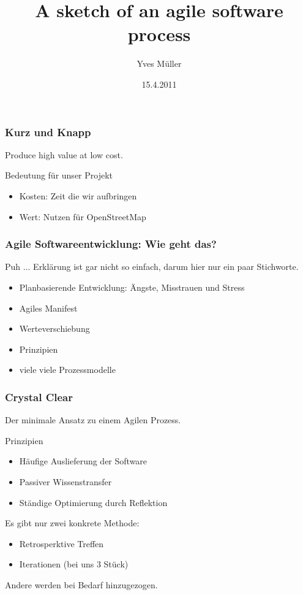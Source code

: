 \documentclass{beamer}
\title[]{A sketch of an agile software process}
\author{Yves Müller}
\institute{Institute for Computer Science, Freie University Berlin}
\date{15.4.2011}
\begin{document}
\begin{frame}
\titlepage
\end{frame}

\begin{frame}[fragile]
    \frametitle{Kurz und Knapp}
    \begin{definition}
    Produce high value at low cost.
    \end{definition}

    \vspace{0.2in}
    Bedeutung für unser Projekt

    \begin{itemize}
    \item Kosten: Zeit die wir aufbringen
    \item Wert: Nutzen für OpenStreetMap
    \end{itemize}
\end{frame}

\begin{frame}
    \frametitle{Agile Softwareentwicklung: Wie geht das?}
    
    Puh ... Erklärung ist gar nicht so einfach, darum hier nur ein paar Stichworte.

        \begin{itemize}
            \item Planbasierende Entwicklung: Ängste, Misstrauen und Stress
            \item Agiles Manifest
            \item Werteverschiebung
            \item Prinzipien
            \item viele viele Prozessmodelle
        \end{itemize}
\end{frame}


\begin{frame}
    \frametitle{Crystal Clear}
     
     Der minimale Ansatz zu einem Agilen Prozess.

    \begin{block}{Prinzipien}
          
        \begin{itemize}
            \item Häufige Auslieferung der Software
            \item Passiver Wissenstransfer 
            \item Ständige Optimierung durch Reflektion
        \end{itemize}
    \end{block}
    
    Es gibt nur zwei konkrete Methode: 

        \begin{itemize}
            \item Retrosperktive Treffen
            \item Iterationen (bei uns 3 Stück)
        \end{itemize}

    Andere werden bei Bedarf hinzugezogen.

\end{frame}
\end{document}
